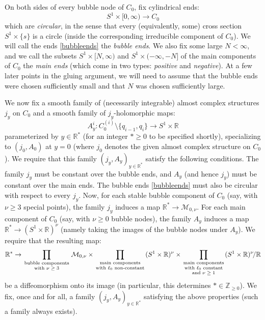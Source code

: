 \documentclass[12pt]{article}
\theoremstyle{definition}
\theoremstyle{remark}
\numberwithin{equation}{subsection}
\newcommand{\ZZ}{\mathbb Z}
\newcommand{\RR}{\mathbb R}
\begin{document}
On both sides of every bubble node of $C_0$, fix cylindrical ends:
\begin{equation}\label{bubbleends}
S^1\times[0,\infty)\to C_0
\end{equation}
which are \emph{circular}, in the sense that every (equivalently, some) cross section $S^1\times\{s\}$ is a circle (inside the corresponding irreducible component of $C_0$).  We will call the ends \eqref{bubbleends} the \emph{bubble ends}.  We also fix some large $N<\infty$, and we call the subsets $S^1\times[N,\infty)$ and $S^1\times(-\infty,-N]$ of the main components of $C_0$ the \emph{main ends} (which come in two types: \emph{positive} and \emph{negative}).  At a few later points in the gluing argument, we will need to assume that the bubble ends were chosen sufficiently small and that $N$ was chosen sufficiently large.

We now fix a smooth family of (necessarily integrable) almost complex structures $j_y$ on $C_0$ and a smooth family of $j_y$-holomorphic maps:
\begin{equation}\label{Aymaps}
A_y^i:C^{(i)}_0\setminus\{q_{i-1},q_i\}\to S^1\times\RR
\end{equation}
parameterized by $y\in\RR^\ast$ (for an integer $\ast\geq 0$ to be specified shortly), specializing to $(j_0,A_0)$ at $y=0$ (where $j_0$ denotes the given almost complex structure on $C_0$).  We require that this family $(j_y,A_y)_{y\in\RR^\ast}$ satisfy the following conditions.  The family $j_y$ must be constant over the bubble ends, and $A_y$ (and hence $j_y$) must be constant over the main ends.  The bubble ends \eqref{bubbleends} must also be circular with respect to every $j_y$.  Now, for each stable bubble component of $C_0$ (say, with $\nu\geq 3$ special points), the family $j_y$ induces a map $\RR^\ast\to\mathcal M_{0,\nu}$.  For each main component of $C_0$ (say, with $\nu\geq 0$ bubble nodes), the family $A_y$ induces a map $\RR^\ast\to(S^1\times\RR)^\nu$ (namely taking the images of the bubble nodes under $A_y$).  We require that the resulting map:
\begin{equation*}
\RR^\ast\to\prod_{\begin{smallmatrix}\text{bubble components}\cr\text{with $\nu\geq 3$}\end{smallmatrix}}\mathcal M_{0,\nu}\times\prod_{\begin{smallmatrix}\text{main components}\cr\text{with $\ell_0$ non-constant}\end{smallmatrix}}(S^1\times\RR)^\nu\times\prod_{\begin{smallmatrix}\text{main components}\cr\text{with $\ell_0$ constant}\cr\text{and $\nu\geq 1$}\end{smallmatrix}}(S^1\times\RR)^\nu\!/\RR
\end{equation*}
be a diffeomorphism onto its image (in particular, this determines $\ast\in\ZZ_{\geq 0}$).  We fix, once and for all, a family $(j_y,A_y)_{y\in\RR^\ast}$ satisfying the above properties (such a family always exists).
\end{document}
